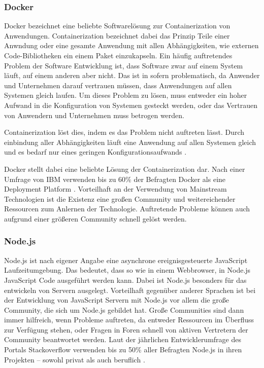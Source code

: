 \subsubsection*{Docker}
Docker bezeichnet eine beliebte Softwarelösung zur Containerization von Anwendungen.
Containerization bezeichnet dabei das Prinzip Teile einer Anwndung oder eine gesamte Anwendung mit allen Abhängigkeiten, wie externen Code-Bibliotheken ein einem Paket einzukapseln.
Ein häufig auftretendes Problem der Software Entwicklung ist, dass Software zwar auf einem System läuft, auf einem anderen aber nicht.
Das ist in sofern problematisch, da Anwender und Unternehmen darauf vertrauen müssen, dass Anwendungen auf allen Systemen gleich laufen.
Um dieses Problem zu lösen, muss entweder ein hoher Aufwand in die Konfiguration von Systemen gesteckt werden, oder das Vertrauen von Anwendern und Unternehmen muss betrogen werden.

Containerization löst dies, indem es das Problem nicht auftreten lässt.
Durch einbindung aller Abhängigkeiten läuft eine Anwendung auf allen Systemen gleich und es bedarf nur eines geringen Konfigurationsaufwands \autocite{B_IBMCloudEducation.2019}.

Docker stellt dabei eine beliebte Lösung der Containerization dar.
Nach einer Umfrage von IBM verwenden bis zu 60\% der Befragten Docker als eine Deployment Platform \autocite{B_IBMCloud.}.
Vorteilhaft an der Verwendung von Mainstream Technologien ist die Existenz eine großen Community und weitereichender Ressourcen zum Anlernen der Technologie.
Auftretende Probleme können auch aufgrund einer größeren Community schnell gelöst werden. 

\subsubsection*{Node.js}
Node.js ist nach eigener Angabe eine asynchrone ereignisgesteuerte JavaScript Laufzeitumgebung. \autocite{Node.js.}
Das bedeutet, dass so wie in einem Webbrowser, in Node.js JavaScript Code ausgeführt werden kann.
Dabei ist Node.js besonders für das entwickeln von Servern ausgelegt.
Vorteilhaft gegenüber anderer Sprachen ist bei der Entwicklung von JavaScript Servern mit Node.js vor allem die große Community, die sich um Node.js gebildet hat.
Große Communities sind dann immer hilfreich, wenn Probleme auftreten, da entweder Ressourcen im Überfluss zur Verfügung stehen, oder Fragen in Foren schnell von aktiven Vertretern der Community beantwortet werden.
Laut der jährlichen Entwicklerumfrage des Portals Stackoverflow verwenden bis zu 50\% aller Befragten Node.js in ihren Projekten -- sowohl privat als auch beruflich \autocite{B_Stackoverflow.2020}.

